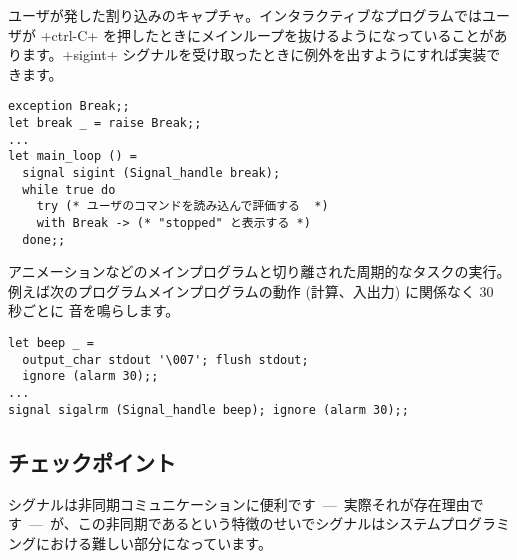 \begin{example}
ユーザが発した割り込みのキャプチャ。インタラクティブなプログラムではユーザが \ml+ctrl-C+ を押したときにメインループを抜けるようになっていることがあります。\ml+sigint+ シグナルを受け取ったときに例外を出すようにすれば実装できます。
%
\begin{lstlisting}
exception Break;;
let break _ = raise Break;;
...
let main_loop () =
  signal sigint (Signal_handle break);
  while true do
    try (* ユーザのコマンドを読み込んで評価する  *)
    with Break -> (* "stopped" と表示する *)
  done;;
\end{lstlisting}
\end{example}

\begin{example}
\label{ex/beep}
アニメーションなどのメインプログラムと切り離された周期的なタスクの実行。例えば次のプログラムメインプログラムの動作 (計算、入出力) に関係なく 30 秒ごとに  音を鳴らします。

\begin{lstlisting}
let beep _ =
  output_char stdout '\007'; flush stdout;
  ignore (alarm 30);;
...
signal sigalrm (Signal_handle beep); ignore (alarm 30);;
\end{lstlisting}
\end{example}

\subsection*{チェックポイント}

シグナルは非同期コミュニケーションに便利です~---~実際それが存在理由です~---~が、この非同期であるという特徴のせいでシグナルはシステムプログラミングにおける難しい部分になっています。

